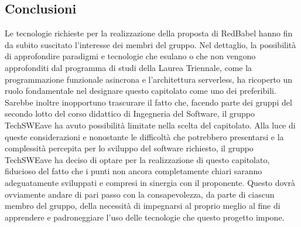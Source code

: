 \subsection{Conclusioni}
Le tecnologie richieste per la realizzazione della proposta di RedBabel hanno fin da subito suscitato l’interesse dei membri del gruppo. Nel dettaglio, la possibilità di approfondire paradigmi e tecnologie che esulano o che non vengono approfonditi dal programma di studi della Laurea Triennale, come la programmazione funzionale asincrona e l’architettura serverless, ha ricoperto un ruolo fondamentale nel designare questo capitolato come uno dei preferibili. Sarebbe inoltre inopportuno trascurare il fatto che, facendo parte dei gruppi del secondo lotto del corso didattico di Ingegneria del Software, il gruppo TechSWEave ha avuto possibilità limitate nella scelta del capitolato. Alla luce di queste considerazioni e nonostante le difficoltà che potrebbero presentarsi e la complessità percepita per lo sviluppo del software richiesto, il gruppo TechSWEave ha deciso di optare per la realizzazione di questo capitolato, fiducioso del fatto che i punti non ancora completamente chiari saranno adeguatamente sviluppati e compresi in sinergia con il proponente. Questo dovrà ovviamente andare di pari passo con la consapevolezza, da parte di ciascun membro del gruppo, della necessità di impegnarsi al proprio meglio al fine di apprendere e padroneggiare l’uso delle tecnologie che questo progetto impone.